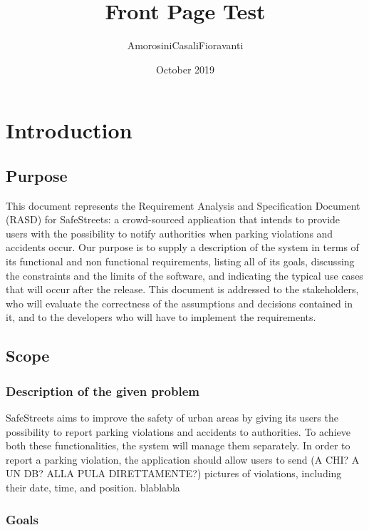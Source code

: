 \documentclass{report}
\title{Front Page Test}
\author{AmorosiniCasaliFioravanti}
\date{October 2019}
\begin{document}
\maketitle 
\tableofcontents
\chapter{Introduction}
\section{Purpose}
This document represents the Requirement Analysis and Specification Document (RASD) for SafeStreets: a crowd-sourced application that intends to provide users with the possibility to notify authorities when parking violations and accidents occur. Our purpose is to supply a description of the system in terms of its functional and non functional requirements, listing all of its goals, discussing the constraints and the limits of the software, and indicating the typical use cases that will occur after the release. This document is addressed to the stakeholders, who will evaluate the correctness of the assumptions and decisions contained in it, and to the developers who will have to implement the requirements.
\section{Scope}
\subsection{Description of the given problem}
SafeStreets aims to improve the safety of urban areas by giving its users the possibility to report parking violations and accidents to authorities. To achieve both these functionalities, the system will manage them separately. In order to report a parking violation, the application should allow users to send (A CHI? A UN DB? ALLA PULA DIRETTAMENTE?) pictures of violations, including their date, time, and position. blablabla
\subsection{Goals}
\end{document}
